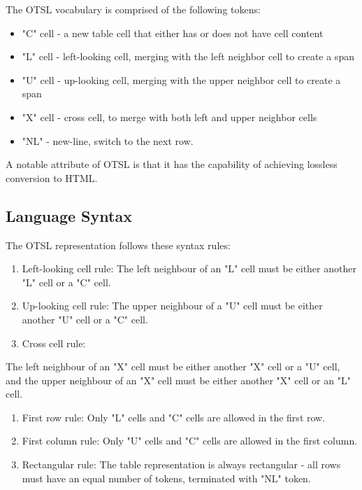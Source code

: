 \documentclass[11pt,a4paper]{article}
\begin{document}
The OTSL vocabulary is comprised of the following tokens:

\begin{itemize}
\item "C" cell - a new table cell that either has or does not have cell content
\item "L" cell - left-looking cell, merging with the left neighbor cell to create a span
\item "U" cell - up-looking cell, merging with the upper neighbor cell to create a span
\item "X" cell - cross cell, to merge with both left and upper neighbor cells
\item "NL" - new-line, switch to the next row.
\end{itemize}

A notable attribute of OTSL is that it has the capability of achieving lossless conversion to HTML.

\subsection{Language Syntax}

The OTSL representation follows these syntax rules:

\begin{enumerate}
\item Left-looking cell rule: The left neighbour of an "L" cell must be either another "L" cell or a "C" cell.
\item Up-looking cell rule: The upper neighbour of a "U" cell must be either another "U" cell or a "C" cell.
\item Cross cell rule:
\end{enumerate}

The left neighbour of an "X" cell must be either another "X" cell or a "U" cell, and the upper neighbour of an "X" cell must be either another "X" cell or an "L" cell.

\begin{enumerate}
\item First row rule: Only "L" cells and "C" cells are allowed in the first row.
\item First column rule: Only "U" cells and "C" cells are allowed in the first column.
\item Rectangular rule: The table representation is always rectangular - all rows must have an equal number of tokens, terminated with "NL" token.
\end{enumerate}
\end{document}
